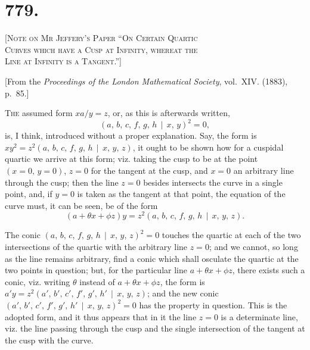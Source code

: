 \documentclass[11pt,a4paper]{book}
\begin{document}
\section*{779.}

\begin{center}
\Large\scshape [Note on Mr Jeffery's Paper ``On Certain Quartic\\Curves which have a Cusp at Infinity, whereat the\\Line at Infinity is a Tangent.'']
\end{center}

\begin{center}
[From the \textit{Proceedings of the London Mathematical Society}, vol.~XIV. (1883), p.~85.]
\end{center}

\textsc{The} assumed form $xa/y = z$, or, as this is afterwards written,
\[
(a,\, b,\, c,\, f,\, g,\, h \,\!\!\mid\!\!\, x,\, y)^{2} = 0,
\]
is, I think, introduced without a proper explanation. Say, the form is $xy^{2} = z^{2}(a,\, b,\, c,\, f,\, g,\, h \,\!\!\mid\!\!\, x,\, y,\, z)$, it ought to be shown how for a cuspidal quartic we arrive at this form; viz. taking the cusp to be at the point $(x=0,\, y=0)$, $z=0$ for the tangent at the cusp, and $x=0$ an arbitrary line through the cusp; then the line $z=0$ besides intersects the curve in a single point, and, if $y=0$ is taken as the tangent at that point, the equation of the curve must, it can be seen, be of the form
\[
(a + \theta x + \phi z)y = z^{2}(a,\, b,\, c,\, f,\, g,\, h \,\!\!\mid\!\!\, x,\, y,\, z).
\]

The conic $(a,\, b,\, c,\, f,\, g,\, h \,\!\!\mid\!\!\, x,\, y,\, z)^{2} = 0$ touches the quartic at each of the two intersections of the quartic with the arbitrary line $z=0$; and we cannot, so long as the line remains arbitrary, find a conic which shall osculate the quartic at the two points in question; but, for the particular line $a + \theta x + \phi z$, there exists such a conic, viz. writing $\theta$ instead of $a + \theta x + \phi z$, the form is $a'y = z^{2}(a',\, b',\, c',\, f',\, g',\, h' \,\!\!\mid\!\!\, x,\, y,\, z)$; and the new conic $(a',\, b',\, c',\, f',\, g',\, h' \,\!\!\mid\!\!\, x,\, y,\, z)^{2} = 0$ has the property in question. This is the adopted form, and it thus appears that in it the line $z=0$ is a determinate line, viz. the line passing through the cusp and the single intersection of the tangent at the cusp with the curve.
\end{document}
